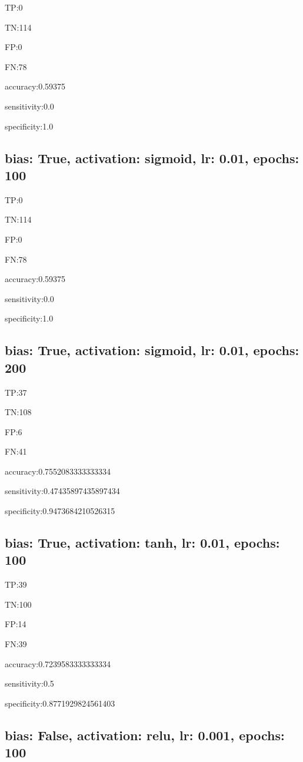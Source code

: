 \documentclass{article}
\begin{document}
TP:0

TN:114

FP:0

FN:78

accuracy:0.59375

sensitivity:0.0

specificity:1.0



\subsection{bias: True, activation: sigmoid, lr: 0.01, epochs: 100}

TP:0

TN:114

FP:0

FN:78

accuracy:0.59375

sensitivity:0.0

specificity:1.0



\subsection{bias: True, activation: sigmoid, lr: 0.01, epochs: 200}

TP:37

TN:108

FP:6

FN:41

accuracy:0.7552083333333334

sensitivity:0.47435897435897434

specificity:0.9473684210526315



\subsection{bias: True, activation: tanh, lr: 0.01, epochs: 100}

TP:39

TN:100

FP:14

FN:39

accuracy:0.7239583333333334

sensitivity:0.5

specificity:0.8771929824561403



\subsection{bias: False, activation: relu, lr: 0.001, epochs: 100}
\end{document}
